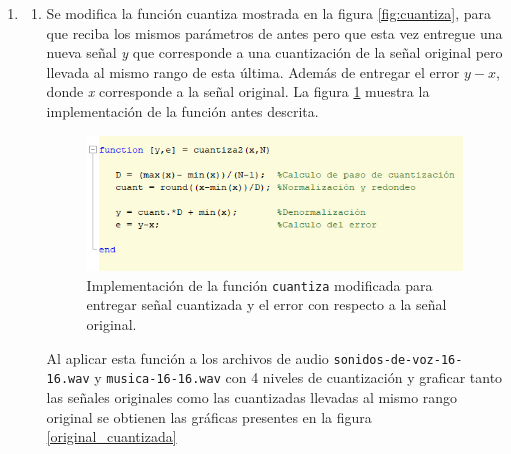 \begin{enumerate}
    \item %
    
    \begin{enumerate}
        \item Se modifica la función cuantiza mostrada en la figura \ref{fig:cuantiza}, para que reciba los mismos parámetros de antes pero que esta vez entregue una nueva señal \textit{y} que corresponde a una cuantización de la señal original pero llevada al mismo rango de esta última. Además de entregar el error  $y-x$, donde \textit{x} corresponde a la señal original. La figura \ref{cuantiza2} muestra la implementación de la función antes descrita.
    
    
    
    \begin{figure}[H]
        \centering
        \includegraphics[scale = 0.5]{imagenes2/cuantiza2.png}
        \caption{Implementación de la función \texttt{cuantiza} modificada para entregar señal cuantizada y el error con respecto a la señal original.}
        \label{cuantiza2}
    \end{figure}
    
        
        Al aplicar esta función a los archivos de  audio \texttt{sonidos-de-voz-16-16.wav} y \texttt{musica-16-16.wav} con 4 niveles de cuantización y graficar tanto las señales originales como las cuantizadas  llevadas al mismo rango original se obtienen las gráficas presentes en la figura \ref{original_cuantizada}
        

\end{enumerate}
\end{enumerate}
